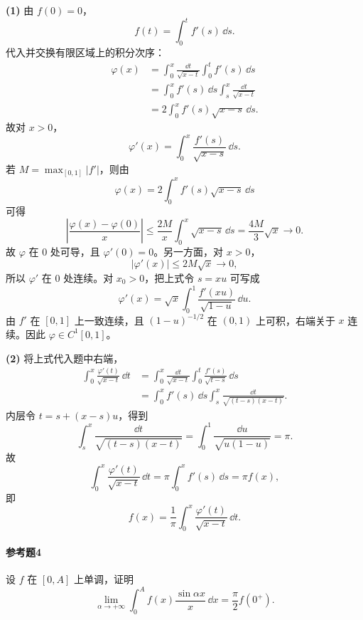 \begin{xsolution}
\textbf{(1)} 由 $f(0)=0$，
\[
f(t)=\int_0^t f'(s)\,\dd s.
\]
代入并交换有限区域上的积分次序：
\[
\begin{aligned}
\varphi(x)
&=\int_0^x\frac{\dd t}{\sqrt{x-t}}
\int_0^t f'(s)\,\dd s\\
&=\int_0^x f'(s)\,\dd s
\int_s^x\frac{\dd t}{\sqrt{x-t}}\\
&=2\int_0^x f'(s)\sqrt{x-s}\,\dd s.
\end{aligned}
\]
故对 $x>0$，
\[
\boxed{
\varphi'(x)=\int_0^x\frac{f'(s)}{\sqrt{x-s}}\,\dd s.}
\]
若 $M=\max_{[0,1]}|f'|$，则由
\[
\varphi(x)=2\int_0^x f'(s)\sqrt{x-s}\,\dd s
\]
可得
\[
\left|\frac{\varphi(x)-\varphi(0)}x\right|
\leqslant\frac{2M}{x}\int_0^x\sqrt{x-s}\,\dd s
=\frac{4M}{3}\sqrt x\to0.
\]
故 $\varphi$ 在 $0$ 处可导，且 $\varphi'(0)=0$。另一方面，对 $x>0$，
\[
|\varphi'(x)|\leqslant2M\sqrt x\to0,
\]
所以 $\varphi'$ 在 $0$ 处连续。对 $x_0>0$，把上式令 $s=xu$ 可写成
\[
\varphi'(x)=\sqrt x\int_0^1\frac{f'(xu)}{\sqrt{1-u}}\,\dd u.
\]
由 $f'$ 在 $[0,1]$ 上一致连续，且 $(1-u)^{-1/2}$ 在 $(0,1)$ 上可积，右端关于 $x$ 连续。因此 $\varphi\in C^1[0,1]$。

\textbf{(2)} 将上式代入题中右端，
\[
\begin{aligned}
\int_0^x\frac{\varphi'(t)}{\sqrt{x-t}}\,\dd t
&=\int_0^x\frac{\dd t}{\sqrt{x-t}}
\int_0^t\frac{f'(s)}{\sqrt{t-s}}\,\dd s\\
&=\int_0^x f'(s)\,\dd s
\int_s^x\frac{\dd t}{\sqrt{(t-s)(x-t)}}.
\end{aligned}
\]
内层令 $t=s+(x-s)u$，得到
\[
\int_s^x\frac{\dd t}{\sqrt{(t-s)(x-t)}}
=\int_0^1\frac{\dd u}{\sqrt{u(1-u)}}=\pi.
\]
故
\[
\int_0^x\frac{\varphi'(t)}{\sqrt{x-t}}\,\dd t
=\pi\int_0^x f'(s)\,\dd s=\pi f(x),
\]
即
\[
\boxed{
f(x)=\frac1\pi\int_0^x\frac{\varphi'(t)}{\sqrt{x-t}}\,\dd t.}
\]
\end{xsolution}

\paragraph{参考题4}
设 $f$ 在 $[0,A]$ 上单调，证明
\[
\lim_{\alpha\to+\infty}
\int_0^A f(x)\frac{\sin\alpha x}{x}\,\dd x
=\frac\pi2f(0^+).
\]

